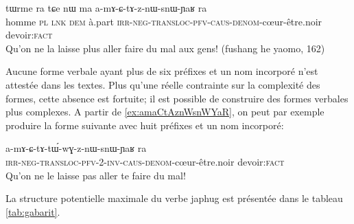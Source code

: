\documentclass[oldfontcommands,oneside,a4paper,11pt]{article}
\newcommand{\ipa}[1]{{\phon \mbox{#1}}} %
\begin{document}

\begin{exe}
\ex  \label{ex:amaCtAznWsnWYaR}
\gll
\ipa{tɯrme}  	\ipa{ra}  	\ipa{tɕe}  	\ipa{nɯ}  	\ipa{ma}  	\ipa{a-mɤ-ɕ-tɤ-z-nɯ-snɯ-ɲaʁ}  	\ipa{ra}  \\
homme \textsc{pl} \textsc{lnk} \textsc{dem} à.part \textsc{irr-neg-transloc-pfv-caus-denom}-cœur-être.noir devoir:\textsc{fact} \\
\glt Qu'on ne la laisse plus aller faire du mal aux gens! (fushang he yaomo, 162)
\end{exe}

Aucune forme verbale ayant plus de six préfixes et un nom incorporé n'est attestée dans les textes. Plus qu'une réelle contrainte sur la complexité des formes, cette absence est fortuite; il est possible de construire des formes verbales plus complexes. A partir de \ref{ex:amaCtAznWsnWYaR}, on peut par exemple produire la forme suivante avec huit préfixes et un nom incorporé:

\begin{exe}
\ex  \label{ex:amaCtAtWwGznWsnWYaR}
\gll
	\ipa{a-mɤ-ɕ-tɤ-tɯ́-wɣ-z-nɯ-snɯ-ɲaʁ}  	\ipa{ra}  \\
  \textsc{irr-neg-transloc-pfv-2-inv-caus-denom}-cœur-être.noir devoir:\textsc{fact} \\
\glt Qu'on ne le laisse pas aller te faire du mal!
\end{exe}

La structure potentielle maximale du verbe japhug est présentée dans le tableau \ref{tab:gabarit}.
\end{document}
